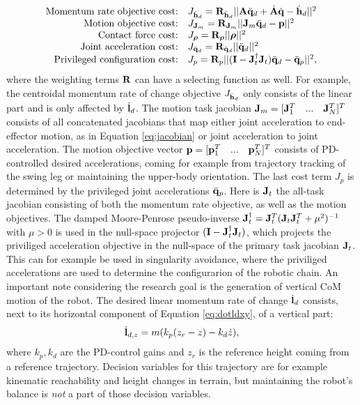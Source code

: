 \begin{equation*}
\begin{array}{rlcl}
$Momentum rate objective cost:$ & J_{\dot{\vect{h}}_d}= \wght_{\dot{\vect{h}}_d}||\matr{A}\ddqjntd + \dot{\matr{A}}\dqjnt - \dot{\vect{h}}_d||^2\\
$Motion objective cost:$ & J_{\matr{J}_m} = \wght_{\matr{J}_m}||\matr{J}_m\ddqjntd-\vect{p}||^2\\
$Contact force cost:$ & J_{\bs{\rho}}=\wght_{\bs{\rho}}||\bs{\rho}||^2 \\
$Joint acceleration cost:$ & J_{\ddqjntd} = \wght_{\ddqjntd}||\ddqjntd ||^2 \\
$Privileged configuration cost:$ & J_p = \wght_p||(\matr{I} - \matr{J}_t^{\dagger}\matr{J}_t)\ddqjntd - \ddqjntp||^2,
\end{array}
\end{equation*}
where the weighting terms $\mathbf{R}$ can have a selecting function as well. For example, the centroidal momentum rate of change objective $J_{\dot{\mathbf{h}}_d}$ only consists of the linear part and is only affected by $\dot{\mathbf{l}}_d$. The motion task jacobian $\mathbf{J}_m = [\mathbf{J}_1^T\quad...\quad\mathbf{J}_N^T]^T$ consists of all concatenated jacobians that map either joint acceleration to end-effector motion, as in Equation \eqref{eq:jacobian} or joint acceleration to joint acceleration. The motion objective vector $\mathbf{p} = [\mathbf{p}_1^T\quad...\quad\mathbf{p}_N^T]^T$  consists of PD-controlled desired accelerations, coming for example from trajectory tracking of the swing leg or maintaining the upper-body orientation. The last cost term $J_p$ is determined by the privileged joint accelerations $\ddot{\mathbf{q}}_p$. Here is $\mathbf{J}_t$ the all-task jacobian consisting of both the momentum rate objective, as well as the motion objectives. The damped Moore-Penrose pseudo-inverse  $\mathbf{J}_t^{\dagger} = \mathbf{J}_t^T(\mathbf{J}_t\mathbf{J}_t^T +\mu^2)^{-1}$ with $\mu>0$ is used in the null-space projector $(\mathbf{I} - \mathbf{J}_t^{\dagger}\mathbf{J}_t)$, which projects the priviliged acceleration objective in the null-space of the primary task jacobian $\mathbf{J}_t$. This can for example be used in singularity avoidance, where the priviliged accelerations are used to determine the configurarion of the robotic chain.  
\paraskip
An important note considering the research goal is the generation of vertical \ac{CoM} motion of the robot. The desired linear momentum rate of change $\dot{\mathbf{l}}_d$ consists, next to its horizontal component of Equation \eqref{eq:dotldxy}, of a vertical part:
\begin{equation}
\dot{\mathbf{l}}_{d,z} =m(k_p(z_r-z) - k_d\dot{z}), 
\label{eq:defaultheightcontrol}
\end{equation}
where $k_p, k_d$ are the PD-control gains and $z_r$ is the reference height coming from a reference trajectory. Decision variables for this trajectory are for example kinematic reachability and height changes in terrain, but maintaining the robot's balance is \textit{not } a part of those decision variables.


